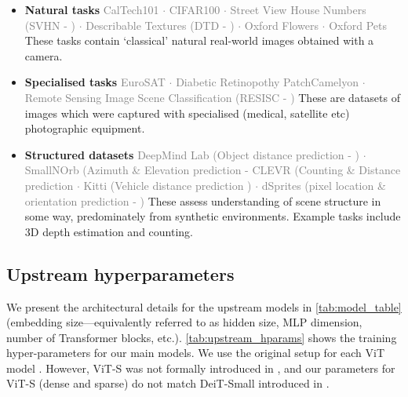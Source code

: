 \documentclass{article}
\begin{document}
\begin{itemize}
    \item \textbf{Natural tasks}
    \small{\textcolor{gray}{CalTech101 \cite{caltech101} $\cdot$ CIFAR100 \cite{krizhevsky2009learning} $\cdot$ Street View House Numbers (SVHN - \cite{svhn}) $\cdot$ Describable Textures (DTD - \cite{dtd}) $\cdot$ Oxford Flowers \cite{nilsback2008automated} $\cdot$ Oxford Pets \cite{parkhi2012cats}}}
    \normalsize These tasks contain `classical' natural real-world images obtained with a camera.
    \item \textbf{Specialised tasks}
    \small{\textcolor{gray}{EuroSAT \cite{eurosat} $\cdot$ Diabetic Retinopothy \cite{retino} PatchCamelyon \cite{camelyon} $\cdot$ Remote Sensing Image Scene Classification (RESISC - \cite{resisc})
    }}
    \normalsize These are datasets of images which were captured with specialised (medical, satellite etc) photographic equipment.
    \item \textbf{Structured datasets}
    \small{\textcolor{gray}{
    DeepMind Lab (Object distance prediction - \cite{zhai2019largescale}) $\cdot$ SmallNOrb (Azimuth \& Elevation prediction - \cite{smallnorb} CLEVR (Counting \& Distance prediction \cite{clevr} $\cdot$ Kitti (Vehicle distance prediction \cite{kitti}) $\cdot$ dSprites (pixel location \& orientation prediction - \cite{dsprites})
    }}
    \normalsize These assess understanding of scene structure in some way, predominately from synthetic environments. Example tasks include 3D depth estimation and counting.
\end{itemize}


\subsection{Upstream hyperparameters}\label{sec:upstream_hparams}

We present the architectural details for the upstream models in \cref{tab:model_table} (embedding size---equivalently referred to as hidden size, MLP dimension, number of Transformer blocks, etc.).
\cref{tab:upstream_hparams} shows the training hyper-parameters for our main models.
We use the original setup for each ViT model \cite{dosovitskiy2020image}.
However, ViT-S was not formally introduced in \cite{dosovitskiy2020image}, and our parameters for ViT-S (dense and sparse) do not match DeiT-Small introduced in \cite{touvron2020deit}.
\end{document}
